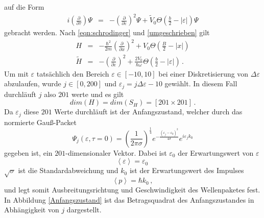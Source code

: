 auf die Form 
\begin{eqnarray}
i\left(\frac{\partial}{\partial \tau}\right)\Psi
&=&
-\left(
\frac{\partial}{\partial \varepsilon}\right)^2
\Psi
+\tilde{V}_0\Theta\left(\frac{b}{2}-\left|\varepsilon\right|\right)\Psi\label{umgeschrieben}
\end{eqnarray}
gebracht werden. Nach \eqref{eqn:schrodinger} und \eqref{umgeschrieben} gilt 
\begin{eqnarray}
H&=&
-\frac{\hbar^2}{2m}\left(
\frac{\partial}{\partial x}\right)^2
+V_0\Theta\left(\frac{B}{2}-\left|x\right|\right)
\\
\tilde{H}
&=&
-\left(
\frac{\partial}{\partial \varepsilon}\right)^2
+\frac{2V_0}{\hbar \omega}\Theta\left(\frac{b}{2}-\left|\varepsilon\right|\right)\,.
\end{eqnarray}
Um mit $\varepsilon$ tatsächlich den Bereich $\varepsilon\in\left[-10,10\right]$ bei einer Diskretisierung von $\Delta\varepsilon$ abzulaufen, wurde $j\in\left[0,200\right]$ 
und $\varepsilon_j=j\Delta\varepsilon-10$ gewählt. In diesem Fall durchläuft $j$ also $201$ werte und es gilt
\begin{equation}
dim\left(H\right)=dim\left(S_H\right)=\left[201\times 201\right]\,.
\end{equation} 
Da $\varepsilon_j$ diese $201$ Werte durchläuft ist der Anfangszustand, welcher durch das normierte Gauß-Packet
\begin{equation}
\Psi_j\left(\varepsilon,\tau=0\right)=
\left(\frac{1}{2\pi\sigma}\right)^{\frac{1}{4}}
e^{-\frac{\left(\varepsilon_j-\varepsilon_0\right)^2}{4\sigma}}
e^{i\varepsilon_jk_0} 
\end{equation}
gegeben ist, ein $201$-dimensionaler Vektor. Dabei ist $\varepsilon_0$ der Erwartungswert von $\varepsilon$
\begin{equation}
\left\langle\varepsilon\right\rangle=\varepsilon_0\,
\end{equation}
$\sqrt{\sigma}$ ist die Standardabweichung und $k_0$ ist der Erwartungswert des Impulses 
\begin{equation}
\left\langle p \right\rangle=\hbar k_0\,,
\end{equation}
und legt somit Ausbreitungsrichtung und Geschwindigkeit des Wellenpaketes fest. In Abbildung \ref{Anfangszustand} ist das Betragsquadrat des Anfangszustandes in Abhängigkeit von $j$ dargestellt.
